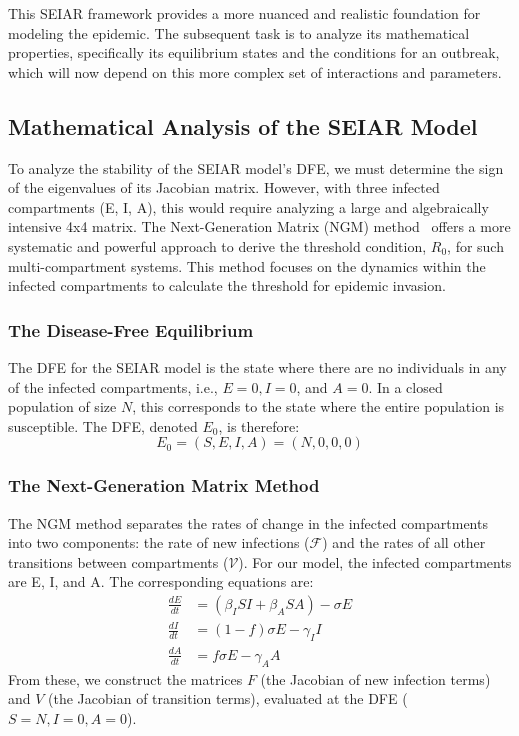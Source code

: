 \documentclass[12pt, a4paper]{article}
\begin{document}
This SEIAR framework provides a more nuanced and realistic foundation for modeling the epidemic. The subsequent task is to analyze its mathematical properties, specifically its equilibrium states and the conditions for an outbreak, which will now depend on this more complex set of interactions and parameters.

\subsection{Mathematical Analysis of the SEIAR Model}
To analyze the stability of the SEIAR model's DFE, we must determine the sign of the eigenvalues of its Jacobian matrix. However, with three infected compartments (E, I, A), this would require analyzing a large and algebraically intensive 4x4 matrix. The Next-Generation Matrix (NGM) method~\cite{vandenDriessche2002} offers a more systematic and powerful approach to derive the threshold condition, $R_0$, for such multi-compartment systems. This method focuses on the dynamics within the infected compartments to calculate the threshold for epidemic invasion.

\subsubsection{The Disease-Free Equilibrium}
The DFE for the SEIAR model is the state where there are no individuals in any of the infected compartments, i.e., $E=0, I=0$, and $A=0$. In a closed population of size $N$, this corresponds to the state where the entire population is susceptible. The DFE, denoted $E_0$, is therefore:
\[ E_0 = (S,E,I,A) = (N,0,0,0) \]

\subsubsection{The Next-Generation Matrix Method}
The NGM method separates the rates of change in the infected compartments into two components: the rate of new infections ($\mathcal{F}$) and the rates of all other transitions between compartments ($\mathcal{V}$). For our model, the infected compartments are E, I, and A. The corresponding equations are:
\begin{align*}
\frac{dE}{dt} &= (\beta_I SI + \beta_A SA) - \sigma E \\
\frac{dI}{dt} &= (1-f)\sigma E - \gamma_I I \\
\frac{dA}{dt} &= f\sigma E - \gamma_A A
\end{align*}
From these, we construct the matrices $F$ (the Jacobian of new infection terms) and $V$ (the Jacobian of transition terms), evaluated at the DFE ($S=N, I=0, A=0$).
\end{document}
